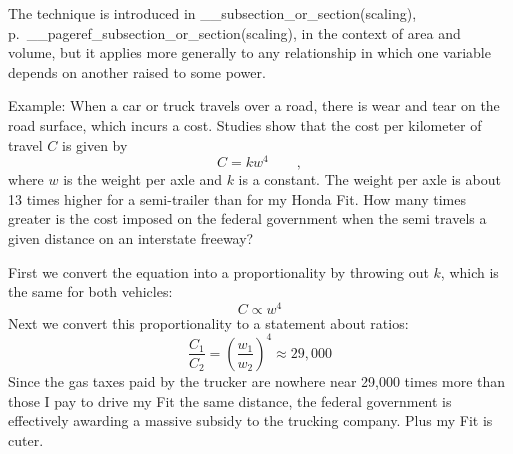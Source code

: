The technique is introduced in __subsection_or_section(scaling), p.~__pageref_subsection_or_section(scaling), in the context of area and volume, but
it applies more generally to any relationship in which one variable depends on another raised to some power.

Example: When a car or truck travels over a road, there is wear and tear on the road surface, which incurs a cost.
Studies show that the cost per kilometer of travel $C$ is given by
\begin{equation*}
  C = k w^4 \qquad ,
\end{equation*}
where $w$ is the weight per axle and $k$ is a constant.
%
%
The weight per axle is about 13 times higher for a semi-trailer than for my Honda Fit.
How many times greater is the cost imposed on the federal government when the semi travels a given distance on an interstate freeway?

\eganswer
First we convert the equation into a proportionality by throwing out $k$, which is the same for both vehicles:
\begin{equation*}
  C \propto w^4
\end{equation*}
Next we convert this proportionality to a statement about ratios:
\begin{equation*}
  \frac{C_1}{C_2} = \left(\frac{w_1}{w_2}\right)^4 \approx 29,000
\end{equation*}
Since the gas taxes paid by the trucker are nowhere near 29,000 times more than those I pay to drive my Fit the
same distance, the federal government is effectively awarding a massive subsidy to the trucking company. Plus my Fit is cuter.
